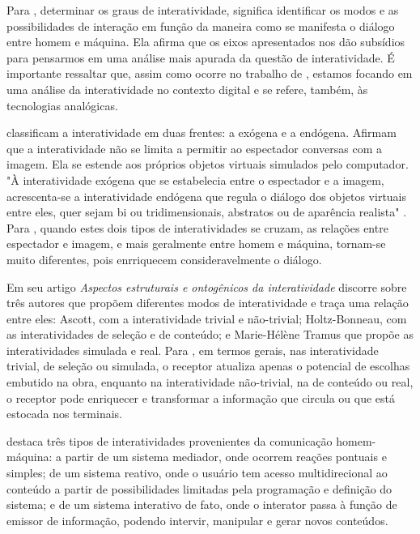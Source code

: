 Para , determinar os graus de interatividade, significa identificar os modos e as possibilidades de interação em função da maneira como se manifesta o diálogo entre homem e máquina. Ela afirma que os eixos apresentados nos dão subsídios para pensarmos em uma análise mais apurada da questão de interatividade. É importante ressaltar que, assim como ocorre no trabalho de , estamos focando em uma análise da interatividade no contexto digital e  se refere, também, às tecnologias analógicas.

 classificam a interatividade em duas frentes: a exógena e a endógena. Afirmam que a interatividade não se limita a permitir ao espectador conversas com a imagem. Ela se estende aos próprios objetos virtuais simulados pelo computador. "À interatividade exógena que se estabelecia entre o espectador e a imagem, acrescenta-se a interatividade endógena que regula o diálogo dos objetos virtuais entre eles, quer sejam bi ou tridimensionais, abstratos ou de aparência realista" \cite[p. 29]{couchot}. Para , quando estes dois tipos de interatividades se cruzam, as relações entre espectador e imagem, e mais geralmente entre homem e máquina, tornam-se muito diferentes, pois enrriquecem consideravelmente o diálogo. 

Em seu artigo \textit{Aspectos estruturais e ontogênicos da interatividade}  discorre sobre três autores que propõem diferentes modos de interatividade e traça uma relação entre eles: Ascott, com a interatividade trivial e não-trivial; Holtz-Bonneau, com  as interatividades de seleção e de conteúdo; e Marie-Hélène Tramus que propõe as interatividades simulada e real. Para , em termos gerais, nas interatividade trivial, de seleção ou simulada, o receptor atualiza apenas o potencial de escolhas embutido na obra, enquanto na interatividade não-trivial, na de conteúdo ou real, o receptor pode enriquecer e transformar a informação que circula ou que está estocada nos terminais. 

 destaca três tipos de interatividades provenientes da comunicação homem-máquina: a partir de um sistema mediador, onde ocorrem reações pontuais e simples; de um sistema reativo, onde o usuário tem acesso multidirecional ao conteúdo a partir de possibilidades limitadas pela programação e definição do sistema; e de um sistema interativo de fato, onde o interator passa à função de emissor de informação, podendo intervir, manipular e gerar novos conteúdos.  

